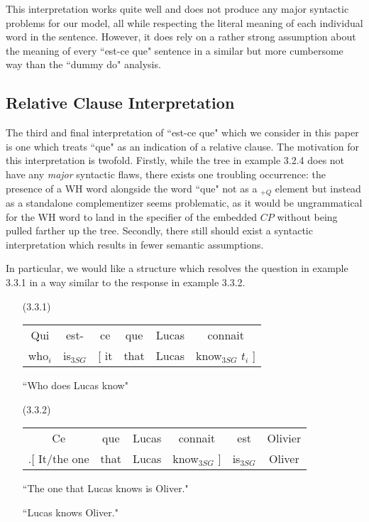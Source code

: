 \documentclass{article}
\begin{document}
This interpretation works quite well and does not produce any major syntactic problems for our model, all while respecting the literal meaning of each individual word in the sentence. However, it does rely on a rather strong assumption about the meaning of every ``est-ce que" sentence in a similar but more cumbersome way than the ``dummy do" analysis.

\subsection{Relative Clause Interpretation}

The third and final interpretation of ``est-ce que" which we consider in this paper is one which treats ``que" as an indication of a relative clause. The motivation for this interpretation is twofold. Firstly, while the tree in example 3.2.4 does not have any \textit{major} syntactic flaws, there exists one troubling occurrence: the presence of a WH word alongside the word ``que" not as a $_{+Q}$ element but instead as a standalone complementizer seems problematic, as it would be ungrammatical for the WH word to land in the specifier of the embedded $CP$ without being pulled farther up the tree. Secondly, there still should exist a syntactic interpretation which results in fewer semantic assumptions.

In particular, we would like a structure which resolves the question in example 3.3.1 in a way similar to the response in example 3.3.2.

\begin{enumerate}
    \item[(3.3.1)]
\begin{tabular}{ cccccc }
    Qui & est- & ce & que & Lucas & connait \\
    who$_i$ & is$_{3SG}$ & [ it & that & Lucas & know$_{3SG}$ $t_i$ ]
\end{tabular}

    ``Who does Lucas know"

    \item[(3.3.2)]
\begin{tabular}{ cccccc }
    Ce & que & Lucas & connait & est & Olivier \\
    .[ It/the one & that & Lucas & know$_{3SG}$ ] & is$_{3SG}$ & Oliver 
\end{tabular}

    ``The one that Lucas knows is Oliver."
    
    ``Lucas knows Oliver."
\end{enumerate}
\end{document}
